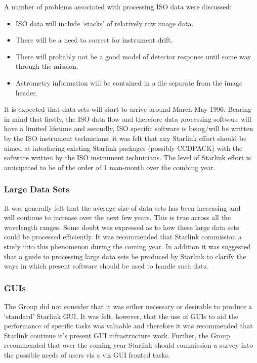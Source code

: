 A number of problems associated with processing ISO data were
discussed:

\begin{itemize}
\item ISO data will include `stacks' of relatively raw image data.
\item There will be a need to correct for instrument drift.
\item There will probably not be a good model of detector response until
some way through the mission.
\item Astrometry information will be contained in a file separate from
the image header.
\end{itemize}

It is expected that data sets will start to arrive around March-May
1996.  Bearing in mind that firstly, the ISO data flow and therefore
data processing software will have a limited lifetime and secondly,
ISO specific software is being/will be written by the ISO instrument
technicians, it was felt that any Starlink effort should be aimed at
interfacing existing Starlink packages (possibly CCDPACK) with the
software written by the ISO instrument technicians. The level of
Starlink effort is anticipated to be of the order of 1 man-month over
the combing year.

\subsubsection{Large Data Sets}

It was generally felt that the average size of data sets has been
increasing and will continue to increase over the next few years. This
is true across all the wavelength ranges. Some doubt was expressed as
to how these large data sets could be processed efficiently. It was
recommended that Starlink commission a study into this phenomenon
during the coming year. In addition it was suggested that a guide to
processing large data sets be produced by Starlink to clarify the ways
in which present software should be used to handle such data.

\subsubsection{GUIs}

The Group did not consider that it was either necessary or desirable
to produce a `standard' Starlink GUI. It was felt, however, that the
use of GUIs to aid the performance of specific tasks was valuable and
therefore it was recommended that Starlink continue it's present GUI
infrastructure work. Further, the Group recommended that over the
coming year Starlink should commission a survey into the possible
needs of users vis a viz GUI fronted tasks.

